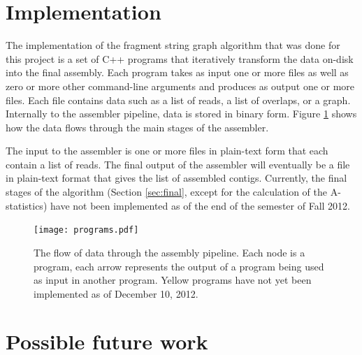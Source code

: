 \documentclass[12pt]{article}
\newcommand{\Figure}[1]{Figure \ref{#1}}
\newcommand{\Section}[1]{Section \ref{#1}}
\begin{document}
\section{Implementation}

The implementation of the fragment string graph algorithm that was done for this
project is a set of C++ programs that iteratively transform the data on-disk
into the final assembly.  Each program takes as input one or more files as well
as zero or more other command-line arguments and produces as output one or more
files.  Each file contains data such as a list of reads, a list of overlaps, or
a graph.  Internally to the assembler pipeline, data is stored in binary form.
\Figure{fig:impl_graph} shows how the data flows through the main stages of the
assembler.

The input to the assembler is one or more files in plain-text form that each
contain a list of reads.  The final output of the assembler will eventually be a
file in plain-text format that gives the list of assembled contigs.  Currently,
the final stages of the algorithm (\Section{sec:final}, except for the
calculation of the A-statistics) have not been implemented as of the end of the
semester of Fall 2012.

\begin{figure}
	\begin{center}
		\texttt{[image: programs.pdf]}
	\end{center}
	\caption{The flow of data through the assembly pipeline.  Each node is a
	program, each arrow represents the output of a program being used as input
	in another program.  Yellow programs have not yet been implemented as of
	December 10, 2012.}
	\label{fig:impl_graph}
\end{figure}

\section{Possible future work}
\end{document}
